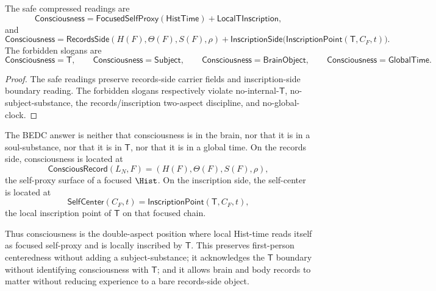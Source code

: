 \begin{corollary}
\label{cor:position-consciousness-safe-slogan}
The safe compressed readings are
$$
\mathsf{Consciousness}
=
\mathsf{FocusedSelfProxy}(\mathsf{HistTime})
+
\mathsf{LocalTInscription},
$$
and
$$
\mathsf{Consciousness}
=
\mathsf{RecordsSide}(H(F),\Theta(F),S(F),\rho)
+
\mathsf{InscriptionSide}
\bigl(\mathsf{InscriptionPoint}(\mathsf{T},C_F,t)\bigr).
$$
The forbidden slogans are
$$
\mathsf{Consciousness}=\mathsf{T},
\qquad
\mathsf{Consciousness}=\mathsf{Subject},
\qquad
\mathsf{Consciousness}=\mathsf{BrainObject},
\qquad
\mathsf{Consciousness}=\mathsf{GlobalTime}.
$$
\end{corollary}

\begin{proof}
The safe readings preserve records-side carrier fields and
inscription-side boundary reading. The forbidden slogans respectively
violate no-internal-$\mathsf{T}$, no-subject-substance, the
records/inscription two-aspect discipline, and no-global-clock.
\end{proof}

\begin{remark}[Reading]
\label{rem:position-consciousness-reading}
The BEDC answer is neither that consciousness is in the brain, nor that it
is in a soul-substance, nor that it is in $\mathsf{T}$, nor that it is in a
global time. On the records side, consciousness is located at
$$
\mathsf{ConsciousRecord}(L_N,F)
=
(H(F),\Theta(F),S(F),\rho),
$$
the self-proxy surface of a focused $\Hist$. On the inscription side, the
self-center is located at
$$
\mathsf{SelfCenter}(C_F,t)
=
\mathsf{InscriptionPoint}(\mathsf{T},C_F,t),
$$
the local inscription point of $\mathsf{T}$ on that focused chain.

Thus consciousness is the double-aspect position where local Hist-time
reads itself as focused self-proxy and is locally inscribed by
$\mathsf{T}$. This preserves first-person centeredness without adding a
subject-substance; it acknowledges the $\mathsf{T}$ boundary without
identifying consciousness with $\mathsf{T}$; and it allows brain and body
records to matter without reducing experience to a bare records-side
object.
\end{remark}


